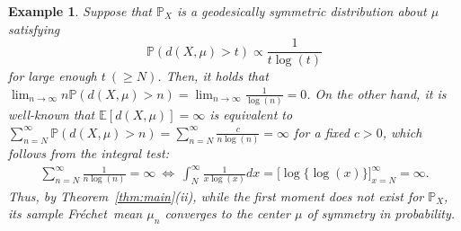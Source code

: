 \documentclass[preprint]{imsart}
\def\Frechet{Fr\'{e}chet}
\theoremstyle{plain}
\newtheorem{example}{Example}
\theoremstyle{remark}
\begin{document}
%

\begin{example}
Suppose that $\mathbb{P}_{X}$ is a geodesically symmetric distribution about $\mu$ satisfying $$\mathbb{P}(d(X, \mu)>t) \propto \frac{1}{t\log(t)}$$ for large enough $t ~(\ge N)$. Then, it holds that $\lim_{n\to \infty}n\mathbb{P}(d(X, \mu)>n) = \lim_{n \to \infty}\frac{1}{\log(n)}= 0$. On the other hand, it is well-known that $\mathbb{E}[d(X, \mu)]=\infty$ is equivalent to $\sum_{n=N}^{\infty} \mathbb{P}(d(X, \mu) > n)= \sum_{n=N}^{\infty}\frac{c}{n\log(n)} =\infty$ for a fixed $c>0$, which follows from the integral test:
\begin{eqnarray*}
\sum_{n=N}^{\infty}\frac{1}{n\log(n)}=\infty ~ \Leftrightarrow ~ \int_{N}^{\infty}\frac{1}{x\log(x)}dx=\big[\log\{\log(x)\}\big]_{x=N}^{\infty} = \infty.
\end{eqnarray*}
Thus, by Theorem~\ref{thm:main}(ii), while the first moment does not exist for $\mathbb{P}_X$, its sample \Frechet\ mean $\mu_n$ converges to the center $\mu$ of symmetry in probability. 
\end{example}
\end{document}
